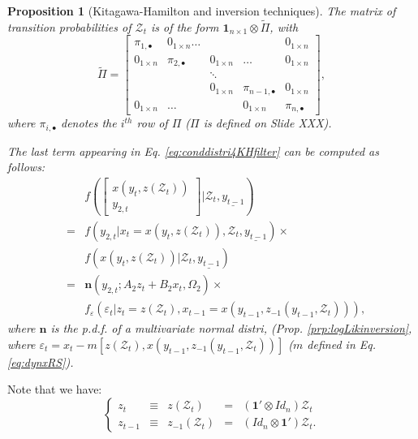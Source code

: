 \documentclass[
  12pt,
]{book}
\newtheorem{proposition}{Proposition}[chapter]
\theoremstyle{definition}
\theoremstyle{definition}
\theoremstyle{definition}
\theoremstyle{definition}
\theoremstyle{remark}
\begin{document}
\begin{proposition}[Kitagawa-Hamilton and inversion techniques]
\protect\hypertarget{prp:mixedKFinversion}{}\label{prp:mixedKFinversion}The matrix of transition probabilities of \(\mathcal{Z}_t\) is of the form \(\mathbf{1}_{n \times 1} \otimes \widetilde{\Pi}\), with
\[
\widetilde{\Pi} =
\left[
\begin{array}{ccccc}
\pi_{1,\bullet} & 0_{1 \times n} \dots & & & 0_{1 \times n} \\
0_{1 \times n} & \pi_{2,\bullet} & 0_{1 \times n} & \dots & 0_{1 \times n} \\
&& \ddots \\
& &  0_{1 \times n} & \pi_{n-1,\bullet} & 0_{1 \times n} \\
0_{1 \times n} &\dots && 0_{1 \times n} & \pi_{n,\bullet}
\end{array}
\right],
\]
where \(\pi_{i,\bullet}\) denotes the \(i^{th}\) row of \(\Pi\) (\(\Pi\) is defined on Slide XXX).

The last term appearing in Eq. \eqref{eq:conddistri4KHfilter} can be computed as follows:
\begin{eqnarray*}
&&f\left(\left[\begin{array}{c}x(y_t,z(\mathcal{Z}_t))\\y_{2,t}\end{array}\right]|\mathcal{Z}_t,\underline{y_{t-1}}\right) \\
&=& f\left(y_{2,t}|x_t=x(y_t,z(\mathcal{Z}_t)),\mathcal{Z}_t,\underline{y_{t-1}}\right) \times\\
&& f\left(x(y_t,z(\mathcal{Z}_t))|\mathcal{Z}_t,\underline{y_{t-1}}\right) \\
&=& \mathbf{n}(y_{2,t};A_2z_t + B_2x_t,\Omega_2) \times\\
&& f_\varepsilon\left(\varepsilon_t|z_t = z(\mathcal{Z}_t),x_{t-1}=x(y_{t-1},z_{-1}(y_{t-1},\mathcal{Z}_t))\right),
\end{eqnarray*}
where \(\mathbf{n}\) is the p.d.f. of a multivariate normal distri, (Prop. \ref{prp:logLikinversion}, where \(\varepsilon_t = x_t - m[z(\mathcal{Z}_t),x(y_{t-1},z_{-1}(y_{t-1},\mathcal{Z}_t))]\) (\(m\) defined in Eq. \eqref{eq:dynxRS}).
\end{proposition}

Note that we have:
\[
\left\{
\begin{array}{cclll}
z_t &\equiv& z(\mathcal{Z}_t) &=& (\mathbf{1}' \otimes Id_{n}) \mathcal{Z}_t \\
z_{t-1} &\equiv& z_{-1}(\mathcal{Z}_t) &=& (Id_{n} \otimes \mathbf{1}') \mathcal{Z}_t.
\end{array}
\right.
\]
\end{document}
